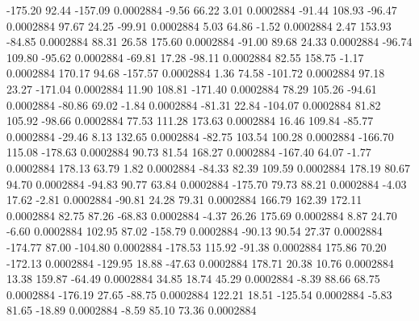      -175.20       92.44     -157.09     0.0002884
       -9.56       66.22        3.01     0.0002884
      -91.44      108.93      -96.47     0.0002884
       97.67       24.25      -99.91     0.0002884
        5.03       64.86       -1.52     0.0002884
        2.47      153.93      -84.85     0.0002884
       88.31       26.58      175.60     0.0002884
      -91.00       89.68       24.33     0.0002884
      -96.74      109.80      -95.62     0.0002884
      -69.81       17.28      -98.11     0.0002884
       82.55      158.75       -1.17     0.0002884
      170.17       94.68     -157.57     0.0002884
        1.36       74.58     -101.72     0.0002884
       97.18       23.27     -171.04     0.0002884
       11.90      108.81     -171.40     0.0002884
       78.29      105.26      -94.61     0.0002884
      -80.86       69.02       -1.84     0.0002884
      -81.31       22.84     -104.07     0.0002884
       81.82      105.92      -98.66     0.0002884
       77.53      111.28      173.63     0.0002884
       16.46      109.84      -85.77     0.0002884
      -29.46        8.13      132.65     0.0002884
      -82.75      103.54      100.28     0.0002884
     -166.70      115.08     -178.63     0.0002884
       90.73       81.54      168.27     0.0002884
     -167.40       64.07       -1.77     0.0002884
      178.13       63.79        1.82     0.0002884
      -84.33       82.39      109.59     0.0002884
      178.19       80.67       94.70     0.0002884
      -94.83       90.77       63.84     0.0002884
     -175.70       79.73       88.21     0.0002884
       -4.03       17.62       -2.81     0.0002884
      -90.81       24.28       79.31     0.0002884
      166.79      162.39      172.11     0.0002884
       82.75       87.26      -68.83     0.0002884
       -4.37       26.26      175.69     0.0002884
        8.87       24.70       -6.60     0.0002884
      102.95       87.02     -158.79     0.0002884
      -90.13       90.54       27.37     0.0002884
     -174.77       87.00     -104.80     0.0002884
     -178.53      115.92      -91.38     0.0002884
      175.86       70.20     -172.13     0.0002884
     -129.95       18.88      -47.63     0.0002884
      178.71       20.38       10.76     0.0002884
       13.38      159.87      -64.49     0.0002884
       34.85       18.74       45.29     0.0002884
       -8.39       88.66       68.75     0.0002884
     -176.19       27.65      -88.75     0.0002884
      122.21       18.51     -125.54     0.0002884
       -5.83       81.65      -18.89     0.0002884
       -8.59       85.10       73.36     0.0002884
